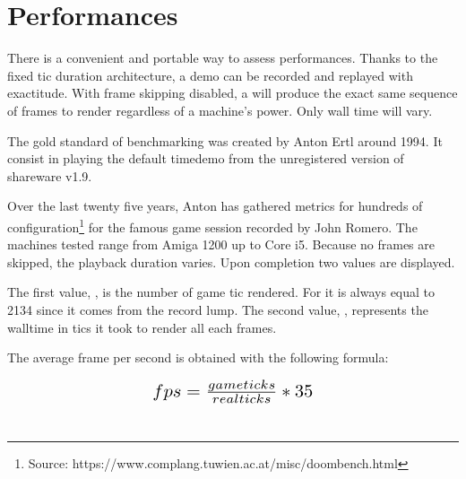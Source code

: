 \vspace{-40pt}
\section{Performances} \label{performances}
There is a convenient and portable way to assess performances. Thanks to the fixed tic duration architecture, a demo can be recorded and replayed with exactitude. With frame skipping disabled, a  will produce the exact same sequence of frames to render regardless of a machine's power. Only wall time will vary.\\
\par
The gold standard of \doom{} benchmarking was created by Anton Ertl around 1994. It consist in playing the default timedemo from the unregistered version of \doom{} shareware v1.9.\\
\par
{}
\par
Over the last twenty five years, Anton has gathered metrics for hundreds of configuration\footnote{Source: https://www.complang.tuwien.ac.at/misc/doombench.html} for the famous game session recorded by John Romero. The machines tested range from Amiga 1200 up to Core i5. Because no frames are skipped, the playback duration varies. Upon completion two values are displayed.\\
\par
{}
\par

The first value, , is the number of game tic rendered. For  it is always equal to 2134 since it comes from the record lump. The second value, , represents the walltime in tics it took to render all each frames.\\
\par
 The average frame per second is obtained with the following formula:\\
 \par 
\begin{equation*}
\resizebox{.4 \textwidth}{!} 
{
 $ fps = \frac{gameticks}{realticks} * 35 $ 
 }
 \end{equation*}\\

